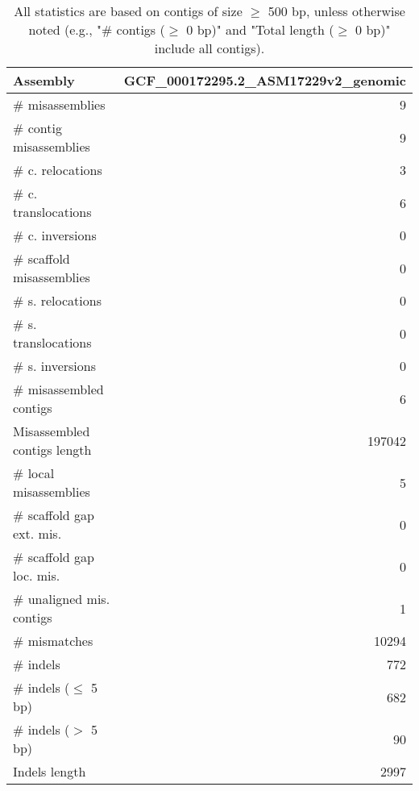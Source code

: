 \documentclass[12pt,a4paper]{article}
\begin{document}
\begin{table}[ht]
\begin{center}
\caption{All statistics are based on contigs of size $\geq$ 500 bp, unless otherwise noted (e.g., "\# contigs ($\geq$ 0 bp)" and "Total length ($\geq$ 0 bp)" include all contigs).}
\begin{tabular}{|l*{1}{|r}|}
\hline
Assembly & GCF\_000172295.2\_ASM17229v2\_genomic \\ \hline
\# misassemblies & 9 \\ \hline
\hspace{2mm}\# contig misassemblies & 9 \\ \hline
\hspace{5mm}\# c. relocations & 3 \\ \hline
\hspace{5mm}\# c. translocations & 6 \\ \hline
\hspace{5mm}\# c. inversions & 0 \\ \hline
\hspace{2mm}\# scaffold misassemblies & 0 \\ \hline
\hspace{5mm}\# s. relocations & 0 \\ \hline
\hspace{5mm}\# s. translocations & 0 \\ \hline
\hspace{5mm}\# s. inversions & 0 \\ \hline
\# misassembled contigs & 6 \\ \hline
Misassembled contigs length & 197042 \\ \hline
\# local misassemblies & 5 \\ \hline
\# scaffold gap ext. mis. & 0 \\ \hline
\# scaffold gap loc. mis. & 0 \\ \hline
\# unaligned mis. contigs & 1 \\ \hline
\# mismatches & 10294 \\ \hline
\# indels & 772 \\ \hline
\hspace{5mm}\# indels ($\leq$ 5 bp) & 682 \\ \hline
\hspace{5mm}\# indels ($>$ 5 bp) & 90 \\ \hline
Indels length & 2997 \\ \hline
\end{tabular}
\end{center}
\end{table}
\end{document}
